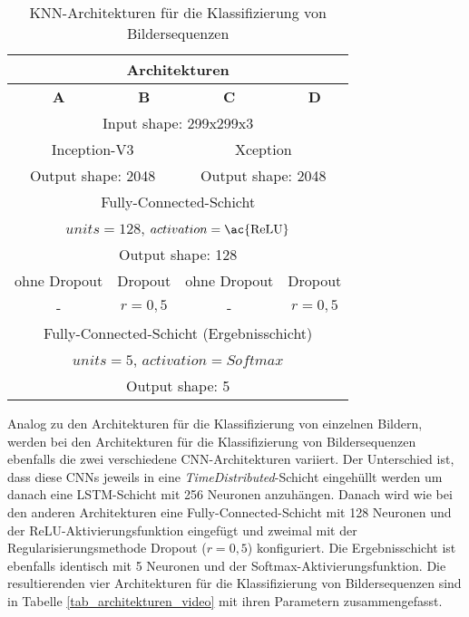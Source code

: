 \begin{table}[h]
\centering
\def\arraystretch{1.4}
\begin{tabular}{|c|c|c|c|}
\hline
\multicolumn{4}{|c|}{\textbf{Architekturen}} \\
\hline
\textbf{A} & \textbf{B} & \textbf{C} & \textbf{D} \\
\hline
\hline
\multicolumn{4}{|c|}{Input shape: 299x299x3} \\
\hline
\multicolumn{2}{|c|}{Inception-V3} & \multicolumn{2}{|c|}{Xception} \\
\multicolumn{2}{|c|}{Output shape: 2048} & \multicolumn{2}{|c|}{Output shape: 2048} \\
\hline
\multicolumn{4}{|c|}{Fully-Connected-Schicht} \\
\multicolumn{4}{|c|}{$units=128$, $activation=\text{\ac{ReLU}}$} \\
\multicolumn{4}{|c|}{Output shape: 128} \\
\hline
ohne Dropout & Dropout & ohne Dropout & Dropout \\
- & $r=0,5$ & - & $r=0,5$ \\
\hline
\multicolumn{4}{|c|}{Fully-Connected-Schicht (Ergebnisschicht)} \\
\multicolumn{4}{|c|}{$units=5$, $activation=Softmax$} \\
\multicolumn{4}{|c|}{Output shape: 5} \\
\hline
\end{tabular}
\caption{\ac{KNN}-Architekturen für die Klassifizierung von Bildersequenzen}
\label{tab_architekturen_bild}
\end{table}

Analog zu den Architekturen für die Klassifizierung von einzelnen Bildern, werden bei den Architekturen für die Klassifizierung von Bildersequenzen ebenfalls die zwei verschiedene \ac{CNN}-Architekturen variiert. Der Unterschied ist, dass diese \acp{CNN} jeweils in eine \textit{TimeDistributed}-Schicht eingehüllt werden um danach eine \ac{LSTM}-Schicht mit 256 Neuronen anzuhängen. Danach wird wie bei den anderen Architekturen eine Fully-Connected-Schicht mit 128 Neuronen und der \ac{ReLU}-Aktivierungsfunktion eingefügt und zweimal mit der Regularisierungsmethode Dropout ($r=0,5$) konfiguriert. Die Ergebnisschicht ist ebenfalls identisch mit 5 Neuronen und der Softmax-Aktivierungsfunktion. Die resultierenden vier Architekturen für die Klassifizierung von Bildersequenzen sind in Tabelle \ref{tab_architekturen_video} mit ihren Parametern zusammengefasst.


